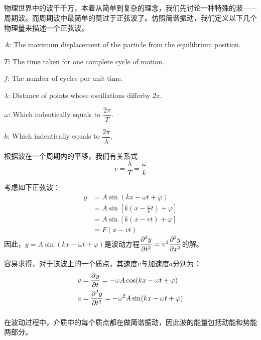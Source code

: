 \subsection[周期波]{}
物理世界中的波千千万，本着从简单到复杂的理念，我们先讨论一种特殊的波——周期波。而周期波中最简单的莫过于正弦波了。仿照简谐振动，我们定义以下几个物理量来描述一个正弦波。
\begin{Itemize}
    \item {} $A$: The maximum displacement of the particle from the equilibrium position.
    \item {} $T$: The time taken for one complete cycle of motion.
    \item {} $f$: The number of cycles per unit time.
    \item {} $\lambda$: Distance of points whose oscillations differby $2\pi$.
    \item {} $\omega$: Which indentically equals to $\dfrac{2\pi}{T}$.
    \item {} $k$: Which indentically equals to $\dfrac{2\pi}{\lambda}$.
\end{Itemize}

根据波在一个周期内的平移，我们有关系式
\[v=\frac{\lambda}{T}=\frac{\omega}{k}\]

考虑如下正弦波：
\[
    \begin{aligned}
        y & =A\sin (kx-\omega t+\varphi)                                  \\
          & =A\sin \left[k\left(x-\frac{\omega}{k}t\right)+\varphi\right] \\
          & =A\sin \left[k\left(x-vt\right)+\varphi\right]                \\
          & =F(x-vt)
    \end{aligned}
\]
因此，$y=A\sin (kx-\omega t+\varphi)$是波动方程$\Par[2]{y}{t}=v^2\Par[2]{y}{x}$的解。

容易求得，对于该波上的一个质点，其速度\(v\)与加速度\(a\)分别为：
\[
    \begin{aligned}
        v & =\Par[]{y}{t}=-\omega A \cos(kx-\omega t+\varphi)    \\
        a & =\Par[2]{y}{t}=-\omega^2 A \sin(kx-\omega t+\varphi)
    \end{aligned}
\]
\subsubsection[能量传递速率]{}
在波动过程中，介质中的每个质点都在做简谐振动，因此波的能量包括动能和势能两部分。

